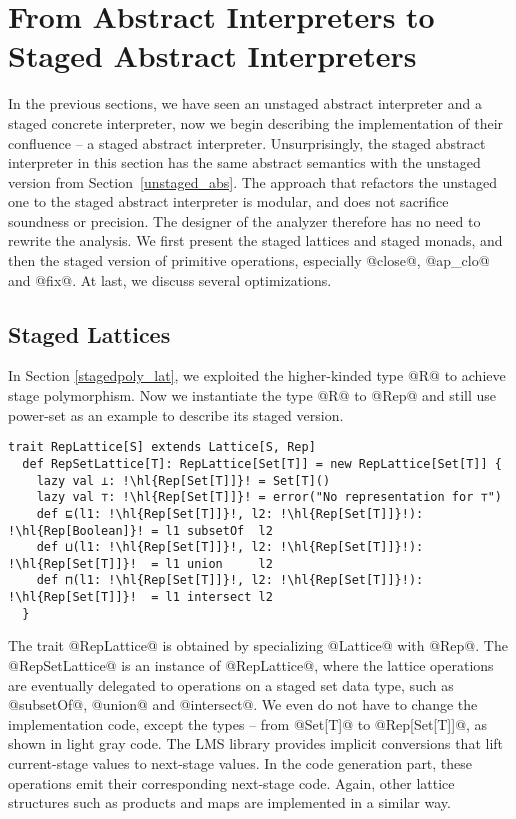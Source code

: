 \section{From Abstract Interpreters to Staged Abstract Interpreters} \label{sai}

In the previous sections, we have seen an unstaged abstract interpreter and a
staged concrete interpreter, now we begin describing the implementation of
their confluence -- a staged abstract interpreter.  Unsurprisingly, the staged
abstract interpreter in this section has the same abstract semantics with the
unstaged version from Section~\ref{unstaged_abs}.  The approach that refactors
the unstaged one to the staged abstract interpreter is modular, and does not
sacrifice soundness or precision. The designer of the analyzer therefore has no
need to rewrite the analysis. We first present the staged lattices and staged
monads, and then the staged version of primitive operations, especially
@close@, @ap_clo@ and @fix@. At last, we discuss several optimizations.

\subsection{Staged Lattices}

In Section \ref{stagedpoly_lat}, we exploited the higher-kinded type @R@ to
achieve stage polymorphism. Now we instantiate the type @R@ to @Rep@ and
still use power-set as an example to describe its staged version.
\begin{lstlisting}[escapechar=!]
  trait RepLattice[S] extends Lattice[S, Rep]
  def RepSetLattice[T]: RepLattice[Set[T]] = new RepLattice[Set[T]] {
    lazy val ⊥: !\hl{Rep[Set[T]]}! = Set[T]()
    lazy val ⊤: !\hl{Rep[Set[T]]}! = error("No representation for ⊤")
    def ⊑(l1: !\hl{Rep[Set[T]]}!, l2: !\hl{Rep[Set[T]]}!): !\hl{Rep[Boolean]}! = l1 subsetOf  l2
    def ⊔(l1: !\hl{Rep[Set[T]]}!, l2: !\hl{Rep[Set[T]]}!): !\hl{Rep[Set[T]]}!  = l1 union     l2
    def ⊓(l1: !\hl{Rep[Set[T]]}!, l2: !\hl{Rep[Set[T]]}!): !\hl{Rep[Set[T]]}!  = l1 intersect l2
  }
\end{lstlisting}

The trait @RepLattice@ is obtained by specializing @Lattice@ with @Rep@.
The @RepSetLattice@ is an instance of @RepLattice@, where the lattice operations
are eventually delegated to operations on a staged set data type, such as
@subsetOf@, @union@ and @intersect@. We even do not have to change the
implementation code, except the types -- from @Set[T]@ to @Rep[Set[T]]@, as shown
in light gray code. The LMS library provides implicit conversions that lift
current-stage values to next-stage values. In the code generation part, these
operations emit their corresponding next-stage code. Again, other lattice
structures such as products and maps are implemented in a similar way.

